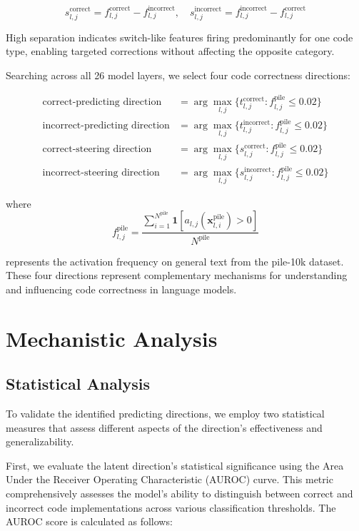\begin{equation}
s_{l,j}^{\text{correct}} = f_{l,j}^{\text{correct}} - f_{l,j}^{\text{incorrect}}, \quad s_{l,j}^{\text{incorrect}} = f_{l,j}^{\text{incorrect}} - f_{l,j}^{\text{correct}}
\end{equation}

High separation indicates switch-like features firing predominantly for one code type, enabling targeted corrections without affecting the opposite category.

Searching across all 26 model layers, we select four code correctness directions:

\begin{align}
\text{correct-predicting direction} &= \arg\max_{l,j} \{t_{l,j}^{\text{correct}} : f_{l,j}^{\text{pile}} \leq 0.02\} \\
\text{incorrect-predicting direction} &= \arg\max_{l,j} \{t_{l,j}^{\text{incorrect}} : f_{l,j}^{\text{pile}} \leq 0.02\} \\
\text{correct-steering direction} &= \arg\max_{l,j} \{s_{l,j}^{\text{correct}} : f_{l,j}^{\text{pile}} \leq 0.02\} \\
\text{incorrect-steering direction} &= \arg\max_{l,j} \{s_{l,j}^{\text{incorrect}} : f_{l,j}^{\text{pile}} \leq 0.02\}
\end{align}

where
\begin{equation}
f_{l,j}^{\text{pile}} = \frac{\sum_{i=1}^{N^{\text{pile}}} \mathbf{1}[a_{l,j}(\mathbf{x}_{l,i}^{\text{pile}}) > 0]}{N^{\text{pile}}}
\end{equation}

represents the activation frequency on general text from the pile-10k dataset. These four directions represent complementary mechanisms for understanding and influencing code correctness in language models.

\section{Mechanistic Analysis}
\subsection{Statistical Analysis}
To validate the identified predicting directions, we employ two statistical measures that assess different aspects of the direction's effectiveness and generalizability.

First, we evaluate the latent direction's statistical significance using the Area Under the Receiver Operating Characteristic (AUROC) curve. This metric comprehensively assesses the model's ability to distinguish between correct and incorrect code implementations across various classification thresholds. The AUROC score is calculated as follows:


